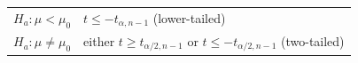 \documentclass{report}
\begin{document}
\begin{itemize}
\begin{tabular}{>{\bfseries}l l}
            $H_a: \mu < \mu_0$ & $t \le -t_{\alpha, n-1}$ (lower-tailed) \\
            $H_a: \mu \neq \mu_0$ & either $t \ge t_{\alpha/2, n-1}$ or $t \le -t_{\alpha/2, n-1}$ (two-tailed) \\
        \end{tabular}

\end{itemize}
\end{document}
